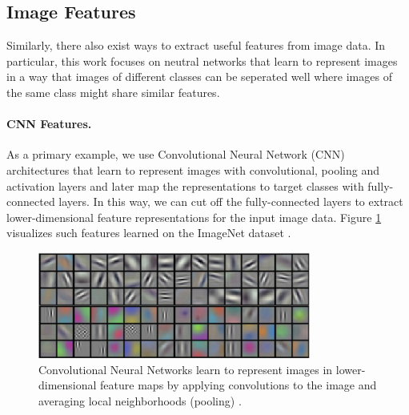 \subsection{Image Features}
\label{sec:imagefeatures}

Similarly, there also exist ways to extract useful features from image data. In particular, this work focuses on neutral networks that learn to represent images in a way that images of different classes can be seperated well where images of the same class might share similar features.\\

\paragraph{CNN Features.} As a primary example, we use Convolutional Neural Network (CNN) architectures that learn to represent images with convolutional, pooling and activation layers and later map the representations to target classes with fully-connected layers. In this way, we can cut off the fully-connected layers to extract lower-dimensional feature representations for the input image data. Figure \ref{fig:cnnfeatures} visualizes such features learned on the ImageNet dataset \cite{krizhevsky2012imagenet}.

\begin{figure}[h]
    \centering
    \includegraphics[width=0.8\textwidth]{images/cnn_features}
    \caption{Convolutional Neural Networks learn to represent images in lower-dimensional feature maps by applying convolutions to the image and averaging local neighborhoods (pooling) \cite{krizhevsky2012imagenet}.}
    \label{fig:cnnfeatures}
\end{figure}